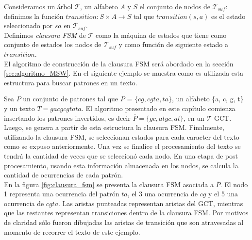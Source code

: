 Consideramos un árbol $\mathcal{T}$, un alfabeto {\it A} y $S$ el conjunto de nodos de $\mathcal{T}_{suf}$: definimos la función $ transition\colon S \times A\to S$ tal que  $transition(s,a)$ es el estado seleccionado por $sa$ en $\mathcal{T}_{suf}$.\\
Definimos \emph{clausura FSM} de $\mathcal{T}$ como la máquina de estados que tiene como conjunto de estados los nodos de $\mathcal{T}_{suf}$ y como función de siguiente estado a $transition$.\\
El algoritmo de construcción de la clausura FSM será abordado en la sección \ref{sec:algoritmo_MSW}. En el siguiente ejemplo se muestra como es utilizada esta estructura para buscar patrones en un texto.
\begin{example*}
Sea $P$ un conjunto de patrones tal que $P$ = $\{cg, cgta, ta\}$, un alfabeto \{a, c, g, t\} y un texto $T=gacgcgtata$. El algoritmo presentado en este capítulo comienza insertando los patrones invertidos, es decir $\overline{P}=\{gc, atgc, at\}$, en un $\mathcal{T}$ GCT. Luego, se genera a partir de esta estructura la clausura FSM.
Finalmente, utilizando la clausura FSM, se seleccionan estados para cada caracter del texto como se expuso anteriormente. Una vez se finalice el procesamiento del texto se tendrá la cantidad de veces que se seleccionó cada nodo. En una etapa de post procesamiento, usando esta información almacenada en los nodos, se calcula la cantidad de ocurrencias de cada patrón.\\
En la figura \ref{fig:clausura_fsm} se presenta la clausura FSM asociada a $\overline{P}$. El nodo 1 representa una ocurrencia del patrón $ta$, el 3 una ocurrencia de $cg$ y el 5 una ocurrencia de $cgta$. Las aristas punteadas representan aristas del GCT, mientras que las restantes representan transiciones dentro de la clausura FSM. Por motivos de claridad sólo fueron dibujadas las aristas de transición que son atravesadas al momento de recorrer el texto de este ejemplo.
\begin{figure}[H]
\centering
{}
\end{figure}
\end{example*}
